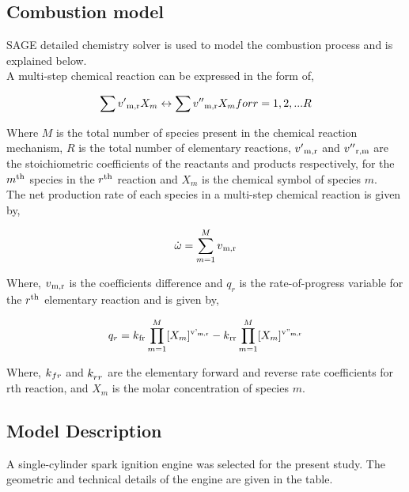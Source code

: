 \documentclass[conference]{IEEEtran}
\begin{document}
\subsection{Combustion model}
SAGE detailed chemistry solver is used to model the combustion process and is explained below.\\
A multi-step chemical reaction can be expressed in the form of,

\begin{gather*}
    \sum v'\textsubscript{m,r} X_m \leftrightarrow \sum v''\textsubscript{m,r} X_m for  r = 1,2,...R
\end{gather*}

Where $M$ is the total number of species present in the chemical reaction mechanism, $R$ is the total number of elementary reactions, $v'\textsubscript{m,r}$ and $v''\textsubscript{r,m}$ are the stoichiometric coefficients of the reactants and products respectively, for the $m\textsuperscript{th}$ species in the $r\textsuperscript{th}$ reaction and $X_m$ is the chemical symbol of species $m$.\\

The net production rate of each species in a multi-step chemical reaction is given by,

\begin{gather*}
    \dot\omega = \sum_{m=1}^{M} v\textsubscript{m,r} 
\end{gather*}

Where, $v\textsubscript{m,r}$ is the coefficients difference and $q_r$ is the rate-of-progress variable for the $r\textsuperscript{th}$ elementary reaction and is given by,

\begin{gather*}
    q_r = k\textsubscript{fr} \prod_{m=1}^{M} [X_m]\textsuperscript{v'\textsubscript{m,r}} - k\textsubscript{rr} \prod_{m=1}^{M} [X_m]\textsuperscript{v''\textsubscript{m,r}}
\end{gather*}

Where, $k\textsubscript{$fr$}$ and $k_\textsubscript{$rr$}$ are the elementary forward and reverse rate coefficients for rth reaction, and $X_m$ is the molar concentration of species $m$.

\subsection{Model Description}
A single-cylinder spark ignition engine was selected for the present study.
The geometric and technical details of the engine are given in the table. 
\end{document}
